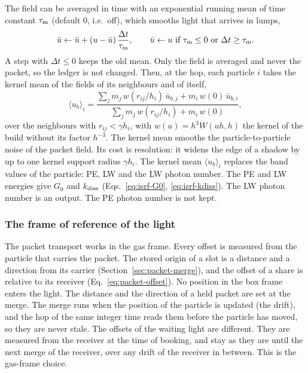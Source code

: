 The field can be averaged in time with an exponential running mean of time
constant $\tau_{\rm m}$ (default 0, i.e.\ off), which smooths light that
arrives in lumps,
\begin{equation}
  \bar u \leftarrow \bar u + (u-\bar u)\,\frac{\Delta t}{\tau_{\rm m}}, \qquad
  \bar u \leftarrow u \ \text{if}\ \tau_{\rm m}\le0\ \text{or}\ \Delta t\ge\tau_{\rm m}.
  \label{eq:packet-runmean}
\end{equation}
A step with $\Delta t\le0$ keeps the old mean. Only the field is averaged and
never the packet, so the ledger is not changed. Then, at the hop, each
particle $i$ takes the kernel mean of the fields of its neighbours and of
itself,
\begin{equation}
  \langle u_b\rangle_i =
  \frac{\sum_j m_j\,w(r_{ij}/h_i)\,\bar u_{b,j} + m_i\,w(0)\,\bar u_{b,i}}
       {\sum_j m_j\,w(r_{ij}/h_i) + m_i\,w(0)},
  \label{eq:packet-kernelmean}
\end{equation}
over the neighbours with $r_{ij}<\gamma h_i$, with $w(u)=h^3W(uh,h)$ the
kernel of the build without its factor $h^{-3}$. The kernel mean smooths the
particle-to-particle noise of the packet field. Its cost is resolution: it widens the edge of a shadow by up to
one kernel support radius $\gamma h_i$. The kernel mean $\langle u_b\rangle_i$
replaces the band values of the particle: PE, LW and the LW photon number. The
PE and LW energies give $G_0$ and $k_{\rm diss}$
(Eqs.~\eqref{eq:isrf-G0}, \eqref{eq:isrf-kdiss}). The LW photon number is an
output. The PE photon number is not kept.

\subsubsection{The frame of reference of the light}
\label{sec:packet-frame}

The packet transport works in the gas frame. Every offset is measured from the
particle that carries the packet. The stored origin of a slot is a distance and
a direction from its carrier (Section~\ref{sec:packet-merge}), and the offset
of a share is relative to its receiver (Eq.~\eqref{eq:packet-offset}). No
position in the box frame enters the light. The distance and the direction of
a held packet are set at the merge. The merge runs when the position of the
particle is updated (the drift), and the hop of the
same integer time reads them before the particle has moved, so they are never
stale. The offsets of the waiting light are different. They are measured
from the receiver at the time of booking, and stay as they are until the next
merge of the receiver, over any drift of the receiver in between. This is the
gas-frame choice.

